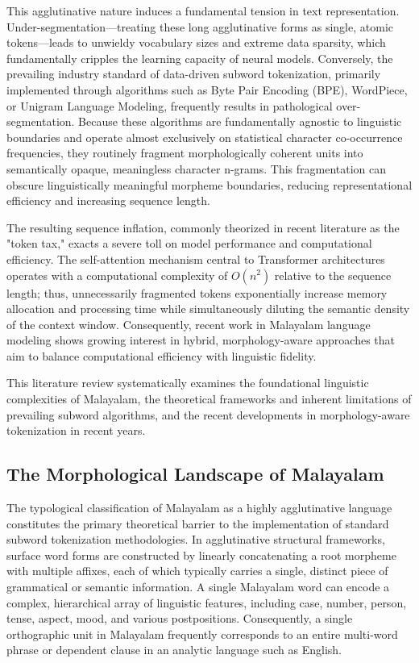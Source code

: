 \documentclass[12pt]{article}
\begin{document}
This agglutinative nature induces a fundamental tension in text representation. Under-segmentation—treating these long agglutinative forms as single, atomic tokens—leads to unwieldy vocabulary sizes and extreme data sparsity, which fundamentally cripples the learning capacity of neural models. Conversely, the prevailing industry standard of data-driven subword tokenization, primarily implemented through algorithms such as Byte Pair Encoding (BPE), WordPiece, or Unigram Language Modeling, frequently results in pathological over-segmentation. Because these algorithms are fundamentally agnostic to linguistic boundaries and operate almost exclusively on statistical character co-occurrence frequencies, they routinely fragment morphologically coherent units into semantically opaque, meaningless character n-grams. This fragmentation can obscure linguistically meaningful morpheme boundaries, reducing representational efficiency and increasing sequence length.\cite{sennrich-etal-2016-neural,brahma2025morphtok}

The resulting sequence inflation, commonly theorized in recent literature as the "token tax," exacts a severe toll on model performance and computational efficiency. The self-attention mechanism central to Transformer architectures operates with a computational complexity of $O(n^2)$ relative to the sequence length; thus, unnecessarily fragmented tokens exponentially increase memory allocation and processing time while simultaneously diluting the semantic density of the context window\cite{token_tax_2025, self_attention_constant_2026}. Consequently, recent work in Malayalam language modeling shows growing interest in hybrid, morphology-aware approaches that aim to balance computational efficiency with linguistic fidelity.\cite{brahma2025morphtok}

This literature review systematically examines the foundational linguistic complexities of Malayalam, the theoretical frameworks and inherent limitations of prevailing subword algorithms, and the recent developments in morphology-aware tokenization in recent years. 

\subsection{The Morphological Landscape of Malayalam}

The typological classification of Malayalam as a highly agglutinative language constitutes the primary theoretical barrier to the implementation of standard subword tokenization methodologies. In agglutinative structural frameworks, surface word forms are constructed by linearly concatenating a root morpheme with multiple affixes, each of which typically carries a single, distinct piece of grammatical or semantic information. A single Malayalam word can encode a complex, hierarchical array of linguistic features, including case, number, person, tense, aspect, mood, and various postpositions. Consequently, a single orthographic unit in Malayalam frequently corresponds to an entire multi-word phrase or dependent clause in an analytic language such as English.
\end{document}
